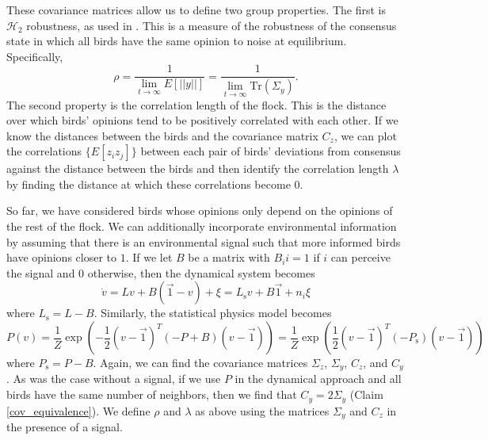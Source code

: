 \documentclass{article}
\newcommand{\Tr}{\text{Tr}}
\begin{document}
These covariance matrices allow us to define two group properties. The first is $\mathscr{H}_2$ robustness, as used in \cite{Young:2010fk,Young:2013kx}. This is a measure of the robustness of the consensus state in which all birds have the same opinion to noise at equilibrium. Specifically, 
\begin{equation}
\rho=\frac{1}{\lim_{t\to\infty}E[||y||]}=\frac{1}{\lim_{t\to\infty}\Tr(\Sigma_y)}. \label{H2def}
\end{equation}
The second property is the correlation length of the flock. This is the distance over which birds' opinions tend to be positively correlated with each other. If we know the distances between the birds and the covariance matrix $C_z$, we can plot the correlations $\{E[z_iz_j]\}$ between each pair of birds' deviations from consensus against the distance between the birds and then identify the correlation length $\lambda$ by finding the distance at which these correlations become $0$.

So far, we have considered birds whose opinions only depend on the opinions of the rest of the flock. We can additionally incorporate environmental information by assuming that there is an environmental signal such that more informed birds have opinions closer to $1$. If we let $B$ be a matrix with $B_ii=1$ if $i$ can perceive the signal and $0$ otherwise, then the dynamical system becomes
\begin{equation}
\dot{v}=Lv+B(\vec{1}-v)+\xi =L_\text{s}v+B\vec{1}+n_i\xi \label{opinion_dynamics2}
\end{equation}
where $L_\text{s}=L-B$. Similarly, the statistical physics model becomes
\begin{equation}
P(v)=\frac{1}{Z}\exp\left(-\frac{1}{2}(v-\vec{1})^T(-P+B)(v-\vec{1})\right)=\frac{1}{Z}\exp\left(\frac{1}{2}(v-\vec{1})^T(-P_\text{s})(v-\vec{1})\right)
\end{equation}
where $P_\text{s}=P-B$. Again, we can find the covariance matrices $\Sigma_z$, $\Sigma_y$, $C_z$, and $C_y$. As was the case without a signal, if we use $P$ in the dynamical approach and all birds have the same number of neighbors, then we find that $C_y=2\Sigma_y$ (Claim \ref{cov_equivalence}). We define $\rho$ and $\lambda$ as above using the matrices $\Sigma_y$ and $C_z$ in the presence of a signal.
\end{document}
